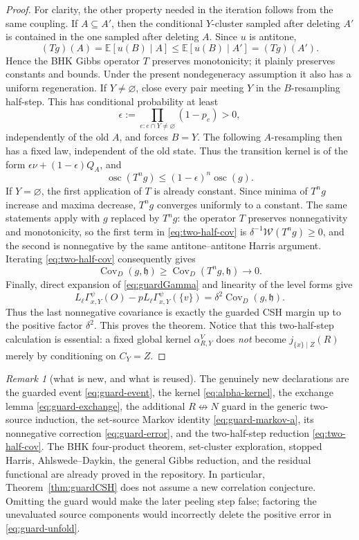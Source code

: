 \documentclass[11pt]{article}
\theoremstyle{definition}
\theoremstyle{remark}
\newtheorem{remark}[theorem]{Remark}
\newcommand{\EE}{\mathbb E}
\newcommand{\ncon}{\not\leftrightarrow}
\begin{document}
\begin{proof}
For clarity, the other property needed in the iteration follows from the
same coupling.  If $A\subseteq A'$, then the conditional $Y$-cluster
sampled after deleting $A'$ is contained in the one sampled after
deleting $A$.  Since $u$ is antitone,
\[
 (Tg)(A)=\EE[u(B)\mid A]
 \leq \EE[u(B)\mid A']=(Tg)(A').
\]
Hence the BHK Gibbs operator $T$ preserves monotonicity; it plainly
preserves constants and bounds.  Under the present nondegeneracy
assumption it also has a uniform regeneration.  If $Y\ne\varnothing$,
close every pair meeting $Y$ in the $B$-resampling half-step.  This has
conditional probability at least
\[
 \epsilon:=\prod_{e:e\cap Y\ne\varnothing}(1-p_e)>0,
\]
independently of the old $A$, and forces $B=Y$.  The following
$A$-resampling then has a fixed law, independent of the old state.  Thus
the transition kernel is of the form
$\epsilon\nu+(1-\epsilon)Q_A$, and
\[
 \operatorname{osc}(T^n g)
 \leq(1-\epsilon)^n\operatorname{osc}(g).
\]
If $Y=\varnothing$, the first application of $T$ is already constant.
Since minima of $T^n g$ increase and maxima decrease, $T^n g$ converges
uniformly to a constant.  The same statements apply with $g$ replaced by
$T^n g$: the operator $T$ preserves nonnegativity and monotonicity, so the
first term in \eqref{eq:two-half-cov} is
$\delta^{-1}\mathcal W(T^n g)\geq0$, and the second is nonnegative by the
same antitone--antitone Harris argument.  Iterating
\eqref{eq:two-half-cov} consequently
gives
\[
 \operatorname{Cov}_D(g,\mathfrak h)
 \geq \operatorname{Cov}_D(T^n g,\mathfrak h)\longrightarrow0.
\]
Finally, direct expansion of \eqref{eq:guardGamma} and linearity of the
level forms give
\[
 L_\ell\Gamma_{x,Y}^{\psi}(O)
 -pL_\ell\Gamma_{x,Y}^{\psi}(\{v\})
 =\delta^2\operatorname{Cov}_D(g,\mathfrak h).
\]
Thus the last nonnegative covariance is exactly the guarded CSH margin
up to the positive factor $\delta^2$.  This proves the theorem.  Notice
that this
two-half-step calculation is essential: a fixed global kernel
$\alpha_{R,Y}^{V}$ does \emph{not} become $j_{\{x\}\mid Z}(R)$ merely by
conditioning on $C_Y=Z$.
\end{proof}

\begin{remark}[what is new, and what is reused]
The genuinely new declarations are the guarded event
\eqref{eq:guard-event}, the kernel \eqref{eq:alpha-kernel}, the exchange
lemma \eqref{eq:guard-exchange}, the additional $R\ncon N$ guard in
the generic two-source induction, the set-source Markov identity
\eqref{eq:guard-markov-a}, its nonnegative correction
\eqref{eq:guard-error}, and the two-half-step reduction
\eqref{eq:two-half-cov}.  The BHK four-product theorem,
set-cluster exploration, stopped Harris, Ahlswede--Daykin, the general
Gibbs reduction, and the residual functional are already proved in the
repository.  In particular, Theorem~\ref{thm:guardCSH} does not assume a
new correlation conjecture.  Omitting the guard would make the later
peeling step false; factoring the unevaluated source components would
incorrectly delete the positive error in \eqref{eq:guard-unfold}.
\end{remark}
\end{document}
